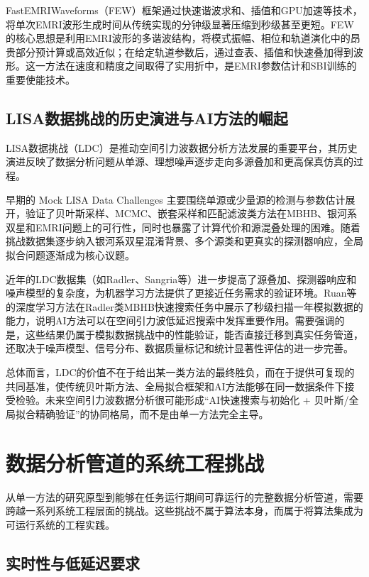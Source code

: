 FastEMRIWaveforms（FEW）框架通过快速谐波求和、插值和GPU加速等技术，将单次EMRI波形生成时间从传统实现的分钟级显著压缩到秒级甚至更短。FEW的核心思想是利用EMRI波形的多谐波结构，将模式振幅、相位和轨道演化中的昂贵部分预计算或高效近似；在给定轨道参数后，通过查表、插值和快速叠加得到波形。这一方法在速度和精度之间取得了实用折中，是EMRI参数估计和SBI训练的重要使能技术。

\subsection{LISA数据挑战的历史演进与AI方法的崛起}

LISA数据挑战（LDC）是推动空间引力波数据分析方法发展的重要平台，其历史演进反映了数据分析问题从单源、理想噪声逐步走向多源叠加和更高保真仿真的过程。

早期的 Mock LISA Data Challenges 主要围绕单源或少量源的检测与参数估计展开，验证了贝叶斯采样、MCMC、嵌套采样和匹配滤波类方法在MBHB、银河系双星和EMRI问题上的可行性，同时也暴露了计算代价和源混叠处理的困难。随着挑战数据集逐步纳入银河系双星混淆背景、多个源类和更真实的探测器响应，全局拟合问题逐渐成为核心议题。

近年的LDC数据集（如Radler、Sangria等）进一步提高了源叠加、探测器响应和噪声模型的复杂度，为机器学习方法提供了更接近任务需求的验证环境。Ruan等的深度学习方法在Radler类MBHB快速搜索任务中展示了秒级扫描一年模拟数据的能力，说明AI方法可以在空间引力波低延迟搜索中发挥重要作用。需要强调的是，这些结果仍属于模拟数据挑战中的性能验证，能否直接迁移到真实任务管道，还取决于噪声模型、信号分布、数据质量标记和统计显著性评估的进一步完善。

总体而言，LDC的价值不在于给出某一类方法的最终胜负，而在于提供可复现的共同基准，使传统贝叶斯方法、全局拟合框架和AI方法能够在同一数据条件下接受检验。未来空间引力波数据分析很可能形成“AI快速搜索与初始化 + 贝叶斯/全局拟合精确验证”的协同格局，而不是由单一方法完全主导。

\section{数据分析管道的系统工程挑战}

从单一方法的研究原型到能够在任务运行期间可靠运行的完整数据分析管道，需要跨越一系列系统工程层面的挑战。这些挑战不属于算法本身，而属于将算法集成为可运行系统的工程实践。

\subsection{实时性与低延迟要求}

